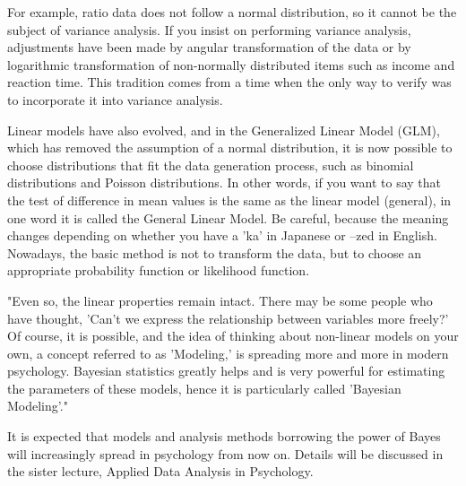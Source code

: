 \documentclass{ltjbook}
\begin{document}
For example, ratio data does not follow a normal distribution, so it cannot be the subject of variance analysis. If you insist on performing variance analysis, adjustments have been made by angular transformation of the data or by logarithmic transformation of non-normally distributed items such as income and reaction time. This tradition comes from a time when the only way to verify was to incorporate it into variance analysis.

Linear models have also evolved, and in the Generalized Linear Model (GLM), which has removed the assumption of a normal distribution, it is now possible to choose distributions that fit the data generation process, such as binomial distributions and Poisson distributions. In other words, if you want to say that the test of difference in mean values is the same as the linear model (general), in one word it is called the General Linear Model. Be careful, because the meaning changes depending on whether you have a 'ka' in Japanese or --zed in English. Nowadays, the basic method is not to transform the data, but to choose an appropriate probability function or likelihood function.

"Even so, the linear properties remain intact. There may be some people who have thought, 'Can't we express the relationship between variables more freely?' Of course, it is possible, and the idea of thinking about non-linear models on your own, a concept referred to as 'Modeling,' is spreading more and more in modern psychology. Bayesian statistics greatly helps and is very powerful for estimating the parameters of these models, hence it is particularly called 'Bayesian Modeling'."

It is expected that models and analysis methods borrowing the power of Bayes will increasingly spread in psychology from now on. Details will be discussed in the sister lecture, Applied Data Analysis in Psychology.
\end{document}
